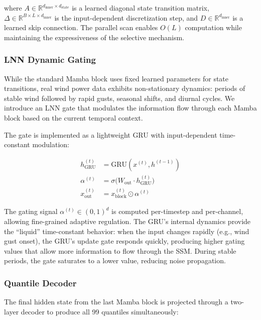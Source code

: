 \documentclass[review]{elsarticle}
\begin{document}
where $A \in \mathbb{R}^{d_{\text{inner}} \times d_{\text{state}}}$ is a learned diagonal state transition matrix, $\Delta \in \mathbb{R}^{B \times L \times d_{\text{inner}}}$ is the input-dependent discretization step, and $D \in \mathbb{R}^{d_{\text{inner}}}$ is a learned skip connection. The parallel scan enables $O(L)$ computation while maintaining the expressiveness of the selective mechanism.

\subsubsection{LNN Dynamic Gating}

While the standard Mamba block uses fixed learned parameters for state transitions, real wind power data exhibits non-stationary dynamics: periods of stable wind followed by rapid gusts, seasonal shifts, and diurnal cycles. We introduce an LNN gate that modulates the information flow through each Mamba block based on the current temporal context.

The gate is implemented as a lightweight GRU with input-dependent time-constant modulation:

\begin{equation}
\begin{aligned}
h_{\text{GRU}}^{(t)} &= \text{GRU}(x^{(t)}, h^{(t-1)}) \\
\alpha^{(t)} &= \sigma\big(W_{\text{out}} \cdot h_{\text{GRU}}^{(t)}\big) \\
x_{\text{out}}^{(t)} &= x_{\text{block}}^{(t)} \odot \alpha^{(t)}
\end{aligned}
\end{equation}

The gating signal $\alpha^{(t)} \in (0, 1)^d$ is computed per-timestep and per-channel, allowing fine-grained adaptive regulation. The GRU's internal dynamics provide the ``liquid'' time-constant behavior: when the input changes rapidly (e.g., wind gust onset), the GRU's update gate responds quickly, producing higher gating values that allow more information to flow through the SSM. During stable periods, the gate saturates to a lower value, reducing noise propagation.

\subsubsection{Quantile Decoder}

The final hidden state from the last Mamba block is projected through a two-layer decoder to produce all 99 quantiles simultaneously:
\end{document}
